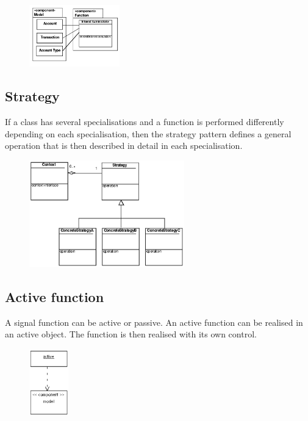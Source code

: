 \begin{figure}[H]
    \centering
    \includegraphics[width=0.35\textwidth]{figures/patternfunctionclass.png}
\end{figure}

\subsection{Strategy}
If a class has several specialisations and a function is performed differently depending on each specialisation, then the strategy pattern defines a general operation that is then described in detail in each specialisation.

\begin{figure}[H]
    \centering
    \includegraphics[width=0.6\textwidth]{figures/patternstrategy.png}
\end{figure}


\subsection{Active function}
A signal function can be active or passive. An active function can be realised in an active object. The function is then realised with its own control.

\begin{figure}[H]
    \centering
    \includegraphics[width=0.15\textwidth]{figures/patternactivefunction.png}
\end{figure}

